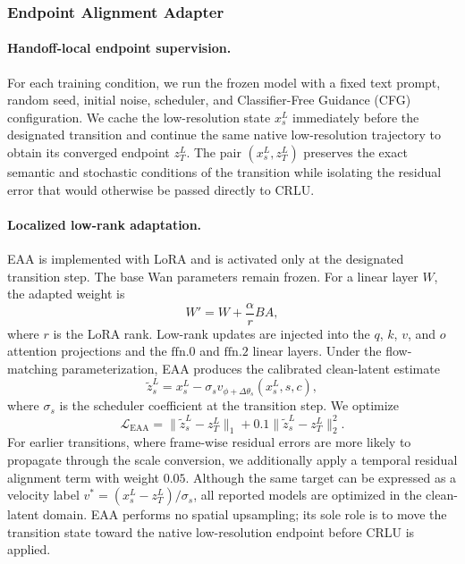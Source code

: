 \subsubsection{Endpoint Alignment Adapter}
\label{sec:eaa}

\paragraph{Handoff-local endpoint supervision.}
For each training condition, we run the frozen model with a fixed text
prompt, random seed, initial noise, scheduler, and Classifier-Free
Guidance (CFG) configuration. We cache the low-resolution state \(x_s^L\)
immediately before the designated transition and continue the same native
low-resolution trajectory to obtain its converged endpoint \(z_T^L\).
The pair \((x_s^L,z_T^L)\) preserves the exact semantic and stochastic
conditions of the transition while isolating the residual error that
would otherwise be passed directly to CRLU.

\paragraph{Localized low-rank adaptation.}
EAA is implemented with LoRA \citep{hu2022lora} and is activated only at
the designated transition step. The base Wan parameters remain frozen.
For a linear layer \(W\), the adapted weight is
\[
W'=W+\frac{\alpha}{r}BA,
\]
where \(r\) is the LoRA rank. Low-rank updates are injected into the
\(q\), \(k\), \(v\), and \(o\) attention projections and the
\(\mathrm{ffn}.0\) and \(\mathrm{ffn}.2\) linear layers. Under the
flow-matching parameterization, EAA produces the calibrated clean-latent
estimate
\[
\widetilde z_s^L
=x_s^L-\sigma_s
v_{\phi+\Delta\theta_s}(x_s^L,s,c),
\]
where \(\sigma_s\) is the scheduler coefficient at the transition step.
We optimize
\[
\mathcal L_{\mathrm{EAA}}
=
\lVert\widetilde z_s^L-z_T^L\rVert_1
+0.1\lVert\widetilde z_s^L-z_T^L\rVert_2^2.
\]
For earlier transitions, where frame-wise residual errors are more likely
to propagate through the scale conversion, we additionally apply a
temporal residual alignment term with weight \(0.05\). Although the same
target can be expressed as a velocity label
\(v^*=(x_s^L-z_T^L)/\sigma_s\), all reported models are optimized in the
clean-latent domain. EAA performs no spatial upsampling; its sole role is
to move the transition state toward the native low-resolution endpoint
before CRLU is applied.


